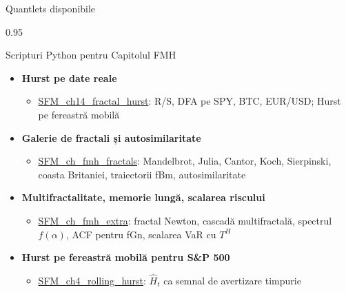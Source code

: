 \documentclass[9pt, aspectratio=169, t]{beamer}
\begin{document}
\begin{frame}[shrink=15]{Quantlets disponibile}
\begin{cminipage}{0.95\textwidth}
\begin{block}{Scripturi Python pentru Capitolul FMH}
\begin{itemize}\setlength{\itemsep}{0pt}
    \item \textbf{Hurst pe date reale}
    \begin{itemize}\setlength{\itemsep}{0pt}
        \item \href{https://github.com/danpele/SFM/tree/main/Quantlets/SFM_ch14}{SFM\_ch14\_fractal\_hurst}: R/S, DFA pe SPY, BTC, EUR/USD; Hurst pe fereastră mobilă
    \end{itemize}
    \item \textbf{Galerie de fractali și autosimilaritate}
    \begin{itemize}\setlength{\itemsep}{0pt}
        \item \href{https://github.com/danpele/SFM/tree/main/Quantlets/SFM_ch_fmh}{SFM\_ch\_fmh\_fractals}: Mandelbrot, Julia, Cantor, Koch, Sierpinski, coasta Britaniei, traiectorii fBm, autosimilaritate
    \end{itemize}
    \item \textbf{Multifractalitate, memorie lungă, scalarea riscului}
    \begin{itemize}\setlength{\itemsep}{0pt}
        \item \href{https://github.com/danpele/SFM/tree/main/Quantlets/SFM_ch_fmh}{SFM\_ch\_fmh\_extra}: fractal Newton, cascadă multifractală, spectrul $f(\alpha)$, ACF pentru fGn, scalarea VaR cu $T^H$
    \end{itemize}
    \item \textbf{Hurst pe fereastră mobilă pentru S\&P 500}
    \begin{itemize}\setlength{\itemsep}{0pt}
        \item \href{https://github.com/danpele/SFM/tree/main/Quantlets/Ch_04/SFM_ch4_rolling_hurst}{SFM\_ch4\_rolling\_hurst}: $\hat H_t$ ca semnal de avertizare timpurie
    \end{itemize}
\end{itemize}
\end{block}
\end{cminipage}
\end{frame}
\end{document}
